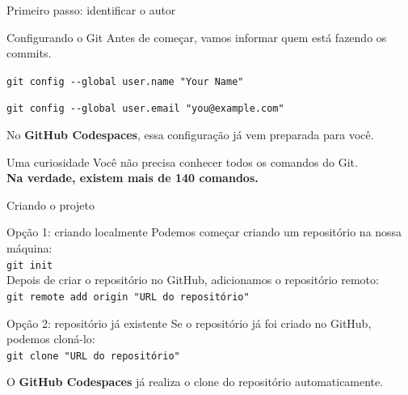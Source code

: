 \begin{frame}{Primeiro passo: identificar o autor}
  \begin{block}{Configurando o Git}
    Antes de começar, vamos informar quem está fazendo os commits.

    \vspace{0.3cm}

    \texttt{git config -{}-global user.name "Your Name"}

    \texttt{git config -{}-global user.email "you@example.com"}
  \end{block}
  No \textbf{GitHub Codespaces}, essa configuração já vem preparada para você.

  \pause

  \begin{alertblock}{Uma curiosidade}
    \centering
    \Large
    Você não precisa conhecer todos os comandos do Git.
    \vspace{0.3cm} \\
    \pause
    \textbf{Na verdade, existem mais de 140 comandos.}
  \end{alertblock}
\end{frame}

\begin{frame}{Criando o projeto}
  \begin{block}{Opção 1: criando localmente}
    Podemos começar criando um repositório na nossa máquina:
    \vspace{0.3cm} \\
    \texttt{git init}
    \vspace{0.3cm} \\
    Depois de criar o repositório no GitHub, adicionamos o repositório remoto:
    \vspace{0.3cm} \\
    \texttt{git remote add origin "URL do repositório"}
  \end{block}
  \begin{block}{Opção 2: repositório já existente}
    Se o repositório já foi criado no GitHub, podemos cloná-lo:
    \vspace{0.3cm} \\
    \texttt{git clone "URL do repositório"}
  \end{block}
  O \textbf{GitHub Codespaces} já realiza o clone do repositório automaticamente.
\end{frame}

